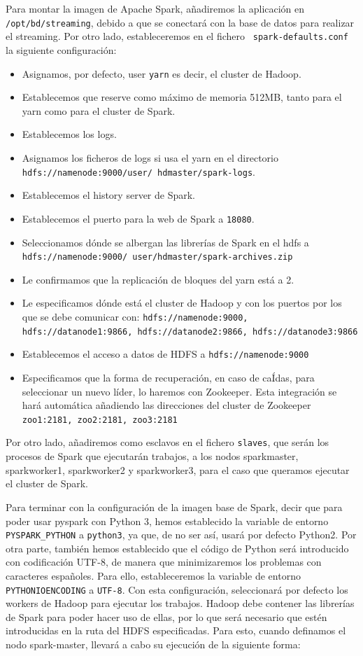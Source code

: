 Para montar la imagen de Apache Spark, añadiremos la aplicación en {\tt
  /opt/bd/streaming}, debido a que se conectará con la base de datos para
realizar el streaming. Por otro lado, estableceremos en el fichero {\tt
  spark-defaults.conf} la siguiente configuración:
\begin{itemize}
\item Asignamos, por defecto, user {\tt yarn} es decir, el cluster de
  Hadoop.
\item Establecemos que reserve como máximo de memoria 512MB, tanto para el
  yarn como para el cluster de Spark.
\item Establecemos los logs.
\item Asignamos los ficheros de logs si usa el yarn en el directorio {\tt
    hdfs://namenode:9000/user/ hdmaster/spark-logs}.
\item Establecemos el history server de Spark.
\item Establecemos el puerto para la web de Spark a {\tt 18080}.
\item Seleccionamos dónde se albergan las librerías de Spark en el hdfs a
  {\tt hdfs://namenode:9000/ user/hdmaster/spark-archives.zip}
\item Le confirmamos que la replicación de bloques del yarn está a 2.
\item Le especificamos dónde está el cluster de Hadoop y con los puertos
  por los que se debe comunicar con: {\tt hdfs://namenode:9000,
    hdfs://datanode1:9866, hdfs://datanode2:9866, hdfs://datanode3:9866}
\item Establecemos el acceso a datos de HDFS a {\tt hdfs://namenode:9000}
\item Especificamos que la forma de recuperación, en caso de caÍdas, para
  seleccionar un nuevo líder, lo haremos con Zookeeper. Esta integración se
  hará automática añadiendo las direcciones del cluster de Zookeeper {\tt
    zoo1:2181, zoo2:2181, zoo3:2181}
\end{itemize}

Por otro lado, añadiremos como esclavos en el fichero {\tt slaves}, que
serán los procesos de Spark que ejecutarán trabajos, a los nodos
sparkmaster, sparkworker1, sparkworker2 y sparkworker3, para el caso que
queramos ejecutar el cluster de Spark.

Para terminar con la configuración de la imagen base de Spark, decir que
para poder usar pyspark con Python 3, hemos establecido la variable de
entorno {\tt PYSPARK\_PYTHON} a {\tt python3}, ya que, de no ser así, usará
por defecto Python2. Por otra parte, también hemos establecido que el
código de Python será introducido con codificación UTF-8, de manera que
minimizaremos los problemas con caracteres españoles. Para ello,
estableceremos la variable de entorno {\tt PYTHONIOENCODING} a {\tt UTF-8}.
Con esta configuración, seleccionará por defecto los workers de Hadoop para
ejecutar los trabajos. Hadoop debe contener las librerías de Spark para
poder hacer uso de ellas, por lo que será necesario que estén introducidas
en la ruta del HDFS especificadas. Para esto, cuando definamos el nodo
spark-master, llevará a cabo su ejecución de la siguiente forma:

